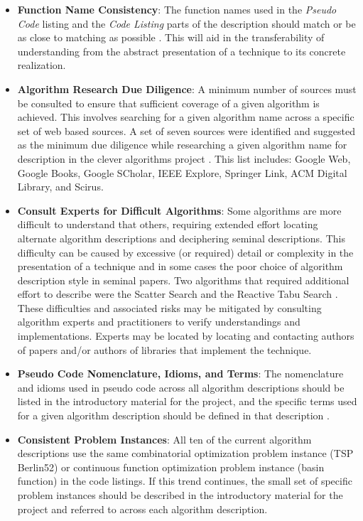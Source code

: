 \documentclass[a4paper, 11pt]{article}
\begin{document}
\begin{itemize}
	\item \textbf{Function Name Consistency}: The function names used in the \emph{Pseudo Code} listing and the \emph{Code Listing} parts of the description should match or be as close to matching as possible \cite{Brownlee2010g}. This will aid in the transferability of understanding from the abstract presentation of a technique to its concrete realization.
	\item \textbf{Algorithm Research Due Diligence}: A minimum number of sources must be consulted to ensure that sufficient coverage of a given algorithm is achieved. This involves searching for a given algorithm name across a specific set of web based sources. A set of seven sources were identified and suggested as the minimum due diligence while researching a given algorithm name for description in the clever algorithms project \cite{Brownlee2010h}. This list includes: Google Web, Google Books, Google SCholar, IEEE Explore, Springer Link, ACM Digital Library, and Scirus.
	\item \textbf{Consult Experts for Difficult Algorithms}: Some algorithms are more difficult to understand that others, requiring extended effort locating alternate algorithm descriptions and deciphering seminal descriptions.  This difficulty can be caused by excessive (or required) detail or complexity in the presentation of a technique and in some cases the poor choice of algorithm description style in seminal papers. Two algorithms that required additional effort to describe were the Scatter Search \cite{Brownlee2010l} and the Reactive Tabu Search \cite{Brownlee2010m}. These difficulties and associated risks may be mitigated by consulting algorithm experts and practitioners to verify understandings and implementations. Experts may be located by locating and contacting authors of papers and/or authors of libraries that implement the technique. 
	\item \textbf{Pseudo Code Nomenclature, Idioms, and Terms}: The nomenclature and idioms used in pseudo code across all algorithm descriptions should be listed in the introductory material for the project, and the specific terms used for a given algorithm description should be defined in that description \cite{Brownlee2010m}.		
	\item \textbf{Consistent Problem Instances}: All ten of the current algorithm descriptions use the same combinatorial optimization problem instance (TSP Berlin52) or continuous function optimization problem instance (basin function) in the code listings. If this trend continues, the small set of specific problem instances should be described in the introductory material for the project and referred to across each algorithm description.

\end{itemize}
\end{document}
